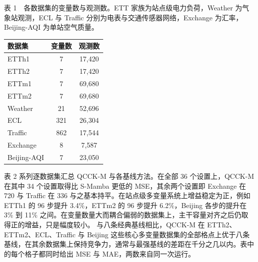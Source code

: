 \begin{center}

\begin{minipage}{\textwidth}

\footnotesize

表 1　各数据集的变量数与观测数。ETT 家族为站点级电力负荷，Weather 为气象站观测，ECL 与 Traffic 分别为电表与交通传感器网络，Exchange 为汇率，Beijing-AQI 为单站空气质量。\\[2pt]

\centering

\setlength{\tabcolsep}{4pt}

\begin{tabular}{@{}lcc@{}}

\hline

数据集 & 变量数 & 观测数 \\ \hline

ETTh1 & 7 & 17,420 \\

ETTh2 & 7 & 17,420 \\

ETTm1 & 7 & 69,680 \\

ETTm2 & 7 & 69,680 \\

Weather & 21 & 52,696 \\

ECL & 321 & 26,304 \\

Traffic & 862 & 17,544 \\

Exchange & 8 & 7,587 \\

Beijing-AQI & 7 & 23,050 \\

\hline

\end{tabular}

\end{minipage}

\end{center}

表 2 系列逐数据集汇总 QCCK-M 与各基线方法。在全部 36 个设置上，QCCK-M 在其中 34 个设置取得比 S-Mamba 更低的 MSE，其余两个设置即 Exchange 在 720 与 Traffic 在 336 与之基本持平。在站点级多变量系统上增益稳定为正，例如 ETTh1 的 96 步提升 3.4\%，ETTm2 的 96 步提升 6.2\%，Beijing 各步的提升在 3\% 到 11\% 之间。在变量数量大而耦合偏弱的数据集上，主干容量对齐之后仍取得正的增益，只是幅度较小。
与八条经典基线相比，QCCK-M 在 ETTh2、ETTm2、ECL、Traffic 与 Beijing 这些核心多变量数据集的全部格点上优于八条基线，在其余数据集上保持竞争力，通常与最强基线的差距在千分之几以内。表中的每个格子都同时给出 MSE 与 MAE，两数来自同一次运行。

